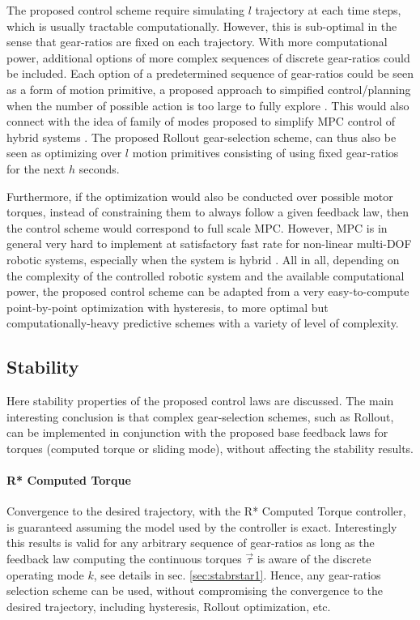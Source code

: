 The proposed control scheme require simulating $l$ trajectory at each time steps, which is usually tractable computationally. However, this is sub-optimal in the sense that gear-ratios are fixed on each trajectory. With more computational power, additional options of more complex sequences of discrete gear-ratios could be included. Each option of a predetermined sequence of gear-ratios could be seen as a form of motion primitive, a proposed approach to simpified control/planning when the number of possible action is too large to fully explore \cite{gray_predictive_2012}. This would also connect with the idea of family of modes proposed to simplify MPC control of hybrid systems \cite{_feedback_????}. The proposed Rollout gear-selection scheme, can thus also be seen as optimizing over $l$ motion primitives consisting of using fixed gear-ratios for the next $h$ seconds. 

Furthermore, if the optimization would also be conducted over possible motor torques, instead of constraining them to always follow a given feedback law, then the control scheme would correspond to full scale MPC. However, MPC is in general very hard to implement at satisfactory fast rate for non-linear multi-DOF robotic systems, especially when the system is hybrid \cite{_feedback_????}. 
%
All in all, depending on the complexity of the controlled robotic system and the available computational power, the proposed control scheme can be adapted from a very easy-to-compute point-by-point optimization with hysteresis, to more optimal but computationally-heavy predictive schemes with a variety of level of complexity. 


\subsection{Stability}

Here stability properties of the proposed control laws are discussed. The main interesting conclusion is that complex gear-selection schemes, such as Rollout, can be implemented in conjunction with the proposed base feedback laws for torques (computed torque or sliding mode), without affecting the stability results. 

\paragraph{R* Computed Torque} Convergence to the desired trajectory, with the R* Computed Torque controller, is guaranteed assuming the model used by the controller is exact. Interestingly this results is valid for any arbitrary sequence of gear-ratios as long as the feedback law computing the continuous torques $\vec{\tau}$ is aware of the discrete operating mode $k$, see details in sec. \ref{sec:stabrstar1}. Hence, any gear-ratios selection scheme can be used, without compromising the convergence to the desired trajectory, including hysteresis, Rollout optimization, etc.

